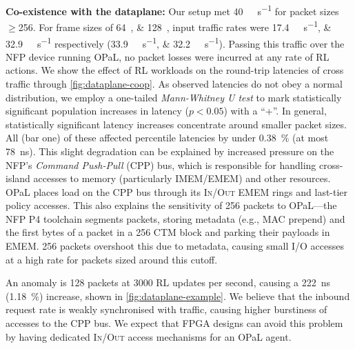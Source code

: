 \documentclass[
conference
,10pt
]{IEEEtran}
\newcommand{\fakepara}[1]{\noindent\textbf{#1:}}
\newcommand{\approachshort}{OPaL}
\newcommand{\inring}{\textsc{In}}
\newcommand{\outring}{\textsc{Out}}
\begin{document}
\fakepara{Co-existence with the dataplane}
Our setup met \SI{40}{\giga\bit\per\second} for packet sizes $\ge$\SI{256}{\byte}.
For frame sizes of \SIlist{64;128}{\byte}, input traffic rates were \SIlist{17.4;32.9}{\giga\bit\per\second} respectively (\SIlist[per-symbol=p,sticky-per=true]{33.9;32.2}{\mega\packet\per\second}).
Passing this traffic over the NFP device running \approachshort, no packet losses were incurred at any rate of RL actions.
We show the effect of RL workloads on the round-trip latencies of cross traffic through \cref{fig:dataplane-coop}.
As observed latencies do not obey a normal distribution, we employ a one-tailed \emph{Mann-Whitney U test} to mark statistically significant population increases in latency ($p < 0.05$) with a ``+''.
In general, statistically significant latency increases concentrate around smaller packet sizes.
All (bar one) of these affected  percentile latencies by under \SI{0.38}{\percent} (at most \SI{78}{\nano\second}).
This slight degradation can be explained by increased pressure on the NFP's \emph{Command Push-Pull} (CPP) bus, which is responsible for handling cross-island accesses to memory (particularly IMEM/EMEM) and other resources.
\approachshort{} places load on the CPP bus through its \inring{}/\outring{} EMEM rings and last-tier policy accesses.
This also explains the sensitivity of \SI{256}{\byte} packets to \approachshort{}---the NFP P4 toolchain segments packets, storing metadata (e.g., MAC prepend) and the first bytes of a packet in a \SI{256}{\byte} CTM block and parking their payloads in EMEM.
\SI{256}{\byte} packets overshoot this due to metadata, causing small I/O accesses at a high rate for packets sized around this cutoff.

An anomaly is \SI{128}{\byte} packets at \num{3000} RL updates per second, causing a \SI{222}{\nano\second} (\SI{1.18}{\percent}) increase, shown in \cref{fig:dataplane-example}.
We believe that the inbound request rate is weakly synchronised with traffic, causing higher burstiness of accesses to the CPP bus.
We expect that FPGA designs can avoid this problem by having dedicated \inring{}/\outring{} access mechanisms for an \approachshort{} agent.
\end{document}
